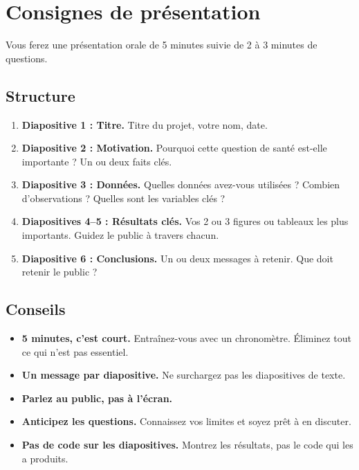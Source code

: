 \section{Consignes de pr\'esentation}

Vous ferez une pr\'esentation orale de 5 minutes suivie de 2 \`a 3 minutes de questions.

\subsection{Structure}

\begin{enumerate}
  \item \textbf{Diapositive 1 : Titre.} Titre du projet, votre nom, date.
  \item \textbf{Diapositive 2 : Motivation.} Pourquoi cette question de sant\'e est-elle importante ? Un ou deux faits cl\'es.
  \item \textbf{Diapositive 3 : Donn\'ees.} Quelles donn\'ees avez-vous utilis\'ees ? Combien d'observations ? Quelles sont les variables cl\'es ?
  \item \textbf{Diapositives 4--5 : R\'esultats cl\'es.} Vos 2 ou 3 figures ou tableaux les plus importants. Guidez le public \`a travers chacun.
  \item \textbf{Diapositive 6 : Conclusions.} Un ou deux messages \`a retenir. Que doit retenir le public ?
\end{enumerate}

\subsection{Conseils}

\begin{itemize}
  \item \textbf{5 minutes, c'est court.} Entra\^inez-vous avec un chronom\`etre. \'Eliminez tout ce qui n'est pas essentiel.
  \item \textbf{Un message par diapositive.} Ne surchargez pas les diapositives de texte.
  \item \textbf{Parlez au public, pas \`a l'\'ecran.}
  \item \textbf{Anticipez les questions.} Connaissez vos limites et soyez pr\^et \`a en discuter.
  \item \textbf{Pas de code sur les diapositives.} Montrez les r\'esultats, pas le code qui les a produits.
\end{itemize}

